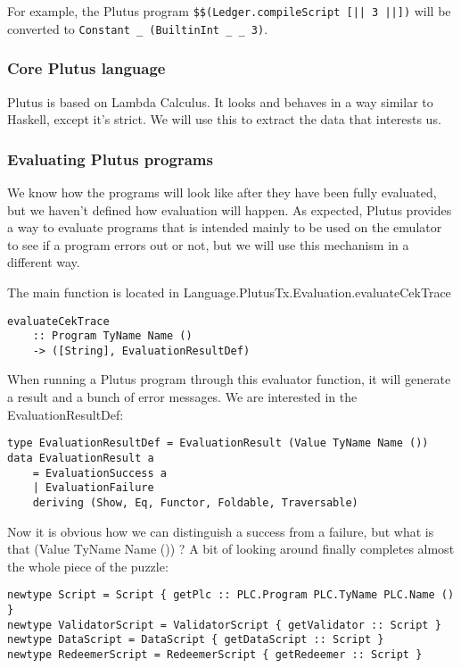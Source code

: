 \documentclass{article}
\begin{document}
For example, the Plutus program \verb#$$(Ledger.compileScript [|| 3 ||])#
will be converted to \verb#Constant _ (BuiltinInt _ _ 3)#.


\subsubsection{Core Plutus language}
Plutus is based on Lambda Calculus. It looks and behaves in a way similar to Haskell, except it's strict. We will use this to extract the data that interests us.

\subsubsection{Evaluating Plutus programs}
We know how the programs will look like after they have been fully evaluated, but we haven't defined how evaluation will happen. As expected, Plutus provides a way to evaluate programs that is intended mainly to be used on the emulator to see if a program errors out or not, but we will use this mechanism in a different way.

The main function is located in Language.PlutusTx.Evaluation.evaluateCekTrace

\begin{verbatim}
evaluateCekTrace
    :: Program TyName Name ()
    -> ([String], EvaluationResultDef)
\end{verbatim}

When running a Plutus program through this evaluator function, it will generate a result and a bunch of error messages. We are interested in the EvaluationResultDef:

\begin{verbatim}
type EvaluationResultDef = EvaluationResult (Value TyName Name ())
data EvaluationResult a
    = EvaluationSuccess a
    | EvaluationFailure
    deriving (Show, Eq, Functor, Foldable, Traversable)
\end{verbatim}

Now it is obvious how we can distinguish a success from a failure, but what is that (Value TyName Name ()) ? A bit of looking around finally completes almost the whole piece of the puzzle:

\begin{verbatim}
newtype Script = Script { getPlc :: PLC.Program PLC.TyName PLC.Name () }
newtype ValidatorScript = ValidatorScript { getValidator :: Script }
newtype DataScript = DataScript { getDataScript :: Script }
newtype RedeemerScript = RedeemerScript { getRedeemer :: Script }
\end{verbatim}
\end{document}
